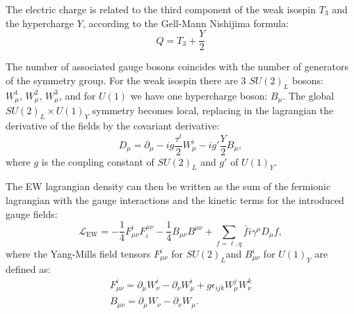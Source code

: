 The electric charge is related to the third component of the weak isospin \(T_3\) and the hypercharge \(Y\), according to the Gell-Mann Nishijima formula:
\begin{equation}
    Q = T_3 + \frac{Y}{2}
\end{equation}

The number of associated gauge bosons coincides with the number of generators of the symmetry group. For the weak isospin there are 3 \(SU(2)_L\) bosons:
\(W_{\mu}^1,\, W_{\mu}^2,\, W_{\mu}^3\), and for \(U(1)\) we have one hypercharge boson: \(B_{\mu}\).
The global \(SU(2)_L \times U(1)_Y\) symmetry becomes local, replacing in the lagrangian the derivative of the fields by the covariant derivative:
\begin{equation}
    \label{eq:theory:sm:mathematical:ew:covariant_derivative}
    D_{\mu} = \partial_{\mu} - ig \frac{\tau^i}{2} W_{\mu}^i - i g' \frac{Y}{2} B_{\mu},
\end{equation}
where \(g\) is the coupling constant of \(SU(2)_L\) and \(g'\) of \(U(1)_Y\).

The \ac{EW} lagrangian density can then be written as the sum of the fermionic lagrangian with the gauge interactions and the kinetic terms for the introduced gauge fields:
\begin{equation}
    \mathcal{L}_{\text{EW}} = 
    - \frac{1}{4} F_{\mu\nu}^i F^{\mu\nu}_i
    - \frac{1}{4} B_{\mu\nu} B^{\mu\nu}
    + \sum_{f = \ell, q} \bar{f} i \gamma^{\mu} D_{\mu} f,
\end{equation}
where the Yang-Mills field tensors \(F_{\mu\nu}^i\) for \(SU(2)_L\)and \(B_{\mu\nu}^i\) for \(U(1)_Y\) are defined as:
\begin{gather}
    F_{\mu\nu}^i = \partial_{\mu} W_{\nu}^i  -  \partial_{\nu} W_{\mu}^i + g \epsilon_{ijk} W_{\mu}^jW_{\nu}^k \\
    B_{\mu\nu} = \partial_{\mu} W_{\nu}  -  \partial_{\nu} W_{\mu}.
\end{gather}



